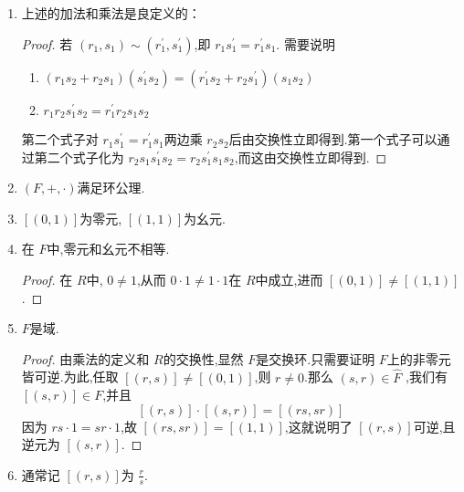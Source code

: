 \documentclass[lang=cn,12pt,color=green,fontset=none,pad]{elegantbook}
\begin{document}
\begin{remark}
    \begin{enumerate}
        \item 上述的加法和乘法是良定义的：
        \begin{proof}
            若 $ \left( r_1,s_1 \right)\sim  \left( r_1^{\prime} ,s_1^{\prime}  \right)   $,即 $ r_1s_1^{\prime} = r_1^{\prime} s_1 $.  
            需要说明\begin{enumerate}
              \item  $ \left( r_1s_2+ r_2s_1 \right)\left( s_1^{\prime} s_2 \right)= \left( r_1^{\prime} s_2+ r_2s_1^{\prime}  \right)\left( s_1s_2 \right)     $
              \item $ r_1r_2s_1^{\prime} s_2=r_1^{\prime} r_2s_1s_2 $  
            \end{enumerate}
            第二个式子对 $ r_1s_1^{\prime} =r_1^{\prime} s_1 $两边乘 $ r_2s_2 $后由交换性立即得到.第一个式子可以通过第二个式子化为 $ r_2s_1s_1^{\prime} s_2=r_2s_1^{\prime} s_1s_2 $,而这由交换性立即得到.
               
            
        \end{proof}
        \item $ \left( F,+ ,\cdot  \right)  $满足环公理.
        \item $ [\left( 0,1 \right) ] $为零元, $ [\left( 1,1 \right) ] $为幺元.
        \item 在 $ F $中,零元和幺元不相等.  
        \begin{proof}
            在 $ R $中, $ 0 \neq  1 $,从而 $ 0\cdot 1\neq 1\cdot  1 $在 $ R $中成立,进而 $[\left( 0,1 \right)    ]\neq  [\left( 1,1 \right) ] $.     
        \end{proof}
        \item $ F $是域.
        \begin{proof}
            由乘法的定义和 $ R $的交换性,显然 $ F $是交换环.只需要证明 $ F $上的非零元皆可逆.为此,任取 $ [\left( r,s \right) ]  \neq  [\left( 0,1 \right) ]$,则 $ r \neq  0 $.那么 $ \left( s,r \right)\in  \hat{F}  $   ,我们有 
            $ [\left( s,r \right) ] \in F $,并且 $$
            [\left( r,s \right) ]\cdot [\left( s,r \right) ]= [\left( rs,sr \right) ]
            $$ 因为 $ rs\cdot 1= sr \cdot  1 $,故 $ [\left( rs,sr \right) ]= [\left( 1,1 \right) ] $,这就说明了 $ [\left( r,s \right) ] $可逆,且逆元为 $ [\left( s,r \right) ] $.    
        \end{proof}
        \item 通常记 $ [\left( r,s \right) ] $为 $ \frac{r}{s} $.  
    \end{enumerate}
    
\end{remark}
\end{document}
